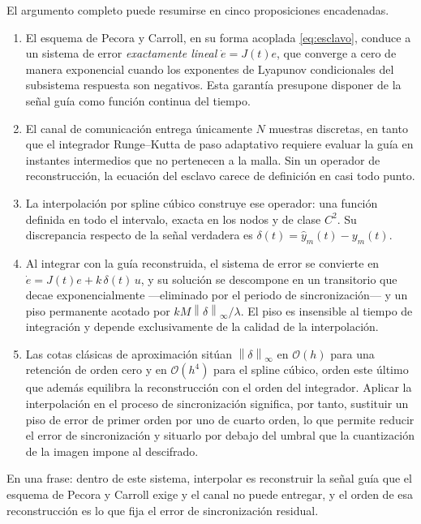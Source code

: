 \documentclass[12pt,a4paper]{article}
\newcommand{\dnorm}[1]{\left\lVert #1 \right\rVert}
\newcommand{\infnorm}[1]{\dnorm{#1}_{\infty}}
\begin{document}
El argumento completo puede resumirse en cinco proposiciones encadenadas.

\begin{enumerate}
  \item El esquema de Pecora y Carroll, en su forma acoplada \eqref{eq:esclavo},
        conduce a un sistema de error \emph{exactamente lineal}
        $\dot{e}=J(t)e$, que converge a cero de manera exponencial cuando los
        exponentes de Lyapunov condicionales del subsistema respuesta son
        negativos. Esta garantía presupone disponer de la señal guía como función
        continua del tiempo.

  \item El canal de comunicación entrega únicamente $N$ muestras discretas, en
        tanto que el integrador Runge--Kutta de paso adaptativo requiere evaluar la
        guía en instantes intermedios que no pertenecen a la malla. Sin un operador
        de reconstrucción, la ecuación del esclavo carece de definición en casi
        todo punto.

  \item La interpolación por spline cúbico construye ese operador: una función
        definida en todo el intervalo, exacta en los nodos y de clase $C^{2}$. Su
        discrepancia respecto de la señal verdadera es
        $\delta(t)=\hat{y}_m(t)-y_m(t)$.

  \item Al integrar con la guía reconstruida, el sistema de error se convierte en
        $\dot{e}=J(t)e+k\,\delta(t)\,u$, y su solución se descompone en un
        transitorio que decae exponencialmente —eliminado por el periodo de
        sincronización— y un piso permanente acotado por
        $k M \infnorm{\delta}/\lambda$. El piso es insensible al tiempo de
        integración y depende exclusivamente de la calidad de la interpolación.

  \item Las cotas clásicas de aproximación sitúan $\infnorm{\delta}$ en
        $\mathcal{O}(h)$ para una retención de orden cero y en $\mathcal{O}(h^{4})$
        para el spline cúbico, orden este último que además equilibra la
        reconstrucción con el orden del integrador. Aplicar la interpolación en el
        proceso de sincronización significa, por tanto, sustituir un piso de error
        de primer orden por uno de cuarto orden, lo que permite reducir el error de
        sincronización y situarlo por debajo del umbral que la cuantización de la
        imagen impone al descifrado.
\end{enumerate}

En una frase: dentro de este sistema, interpolar es reconstruir la señal guía que
el esquema de Pecora y Carroll exige y el canal no puede entregar, y el orden de
esa reconstrucción es lo que fija el error de sincronización residual.
\end{document}
